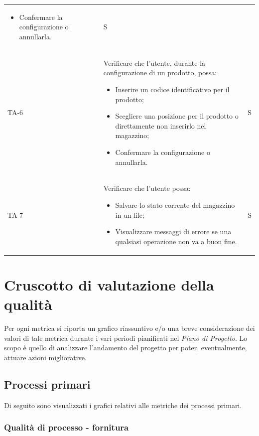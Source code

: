 \begin{xltabular}{0.9\textwidth}{X | p{0.7\textwidth} | X}
\begin{itemize}
        \item Confermare la configurazione o annullarla.
    \end{itemize} 
    & S \\
    TA-6 & Verificare che l'utente, durante la configurazione di un prodotto, possa:
    \begin{itemize}
        \item Inserire un codice identificativo per il prodotto;
        \item Scegliere una posizione per il prodotto o direttamente non inserirlo nel magazzino;
        \item Confermare la configurazione o annullarla.
    \end{itemize} 
    & S \\
    TA-7 & Verificare che l'utente possa:
    \begin{itemize}
        \item Salvare lo stato corrente del magazzino in un file;
        \item Visualizzare messaggi di errore se una qualsiasi operazione non va a buon fine.
    \end{itemize} 
    & S \\
    \hline
\end{xltabular}


\newpage
\section{Cruscotto di valutazione della qualità}\label{resoconto}
Per ogni metrica si riporta un grafico riassuntivo e/o una breve considerazione dei valori di tale metrica durante i vari periodi pianificati nel \textit{Piano di Progetto}. Lo scopo è quello di analizzare l'andamento del progetto per poter, eventualmente, attuare azioni migliorative.

\subsection{Processi primari} \label{sec:processi_primari}
Di seguito sono visualizzati i grafici relativi alle metriche dei processi primari. 
\subsubsection{Qualità di processo - fornitura}

